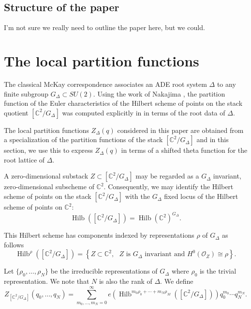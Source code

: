 \documentclass{article}
\theoremstyle{definition}
\newcommand{\CC} {{\mathbb C}}          %
\renewcommand{\O}{\mathcal{O}}
\newcommand{\Hilb}{\operatorname{Hilb}}
\begin{document}
\subsection{Structure of the paper}

I'm not sure we really need to outline the paper here, but we could.


\section{The local partition functions}\label{sec: local partition functions}

The classical McKay correspondence associates an ADE root system
$\Delta$ to any finite subgroup $ G_{\Delta}\subset SU(2)$. Using
the work of Nakajima \cite{nakajima2002geometric}, the partition function of the
Euler characteristics of the Hilbert scheme of points on the stack
quotient $[\CC^{2}/G_{\Delta}]$ was computed explicitly in
\cite{gyenge2015euler} in terms of the root data of $\Delta$.

The local partition functions $Z_{\Delta}(q)$ considered in this paper
are obtained from a specialization of the partition functions of the
stack $[\CC^{2} /G_{\Delta}]$ and in this section, we use this to express
$Z_{\Delta}(q)$ in terms of a shifted theta function for the root
lattice of $\Delta$.

A zero-dimensional substack $Z\subset [\CC^{2}/G_{\Delta}]$ may be
regarded as a $G_{\Delta}$ invariant, zero-dimensional subscheme of
$\CC^{2}$. Consequently, we may identify the Hilbert scheme of points
on the stack $[\CC^{2}/G_{\Delta}]$ with the $G_{\Delta}$ fixed locus
of the Hilbert scheme of points on $\CC^{2}$: 
\[
\Hilb \left([\CC^{2}/G_{\Delta}] \right) = \Hilb
(\CC^{2})^{G_{\Delta}} .
\]

This Hilbert scheme has components indexed by representations $\rho$
of $G_{\Delta}$ as follows
\begin{equation*}
\Hilb^{\rho} \left([\CC^{2}/G_{\Delta}] \right) = \left\{ Z\subset
\CC^{2}, \text{ $Z$ is $G_{\Delta}$ invariant and $H^{0}(\O_{Z})\cong
\rho $} \right\}.
\end{equation*}

Let $\{\rho_{0},\dotsc ,\rho_{N} \}$ be the irreducible
representations of $G_{\Delta}$ where $\rho_{0}$ is the trivial
representation. We note that $N$ is also the rank of $\Delta$. We
define
\[
Z_{[\CC^{2}/G_{\Delta}]} (q_{0},\dotsc ,q_{N}) = \sum_{m_{0},\dotsc
,m_{N}=0}^{\infty} e\left(\Hilb^{m_{0}\rho_{0}+\dotsb
+m_{N}\rho_{M}}([\CC^{2}/G_{\Delta}]) \right) q_{0}^{m_{0}}\dotsb
q_{N}^{m_{N}} .
\]
\end{document}
